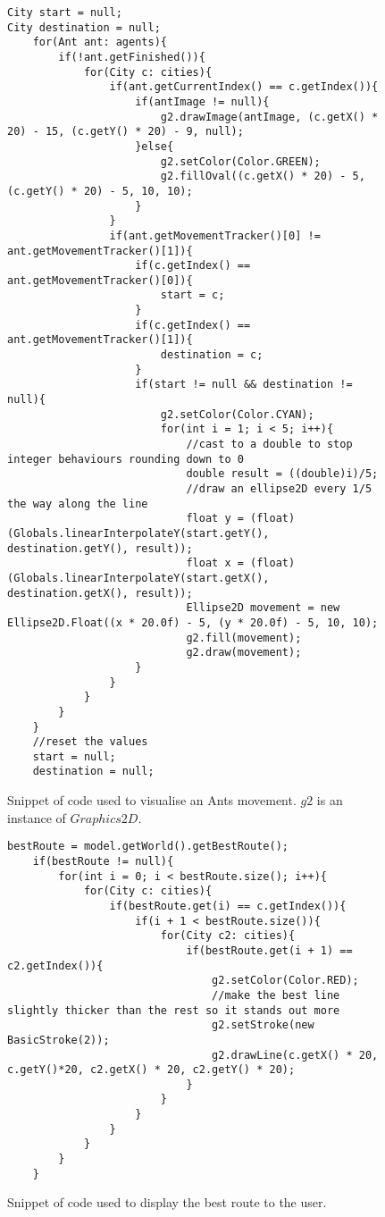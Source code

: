 \begin{figure}[H]
\begin{lstlisting}
City start = null;
City destination = null;
	for(Ant ant: agents){
		if(!ant.getFinished()){
			for(City c: cities){
				if(ant.getCurrentIndex() == c.getIndex()){
					if(antImage != null){
						g2.drawImage(antImage, (c.getX() * 20) - 15, (c.getY() * 20) - 9, null);
					}else{
						g2.setColor(Color.GREEN);
						g2.fillOval((c.getX() * 20) - 5, (c.getY() * 20) - 5, 10, 10);
					}
				}
				if(ant.getMovementTracker()[0] != ant.getMovementTracker()[1]){
					if(c.getIndex() == ant.getMovementTracker()[0]){
						start = c;
					}
					if(c.getIndex() == ant.getMovementTracker()[1]){
						destination = c;
					}
					if(start != null && destination != null){
						g2.setColor(Color.CYAN);
						for(int i = 1; i < 5; i++){
							//cast to a double to stop integer behaviours rounding down to 0
							double result = ((double)i)/5;
							//draw an ellipse2D every 1/5 the way along the line
							float y = (float) (Globals.linearInterpolateY(start.getY(), destination.getY(), result));
							float x = (float) (Globals.linearInterpolateY(start.getX(), destination.getX(), result));
							Ellipse2D movement = new Ellipse2D.Float((x * 20.0f) - 5, (y * 20.0f) - 5, 10, 10);
							g2.fill(movement);
							g2.draw(movement);
					}
				}
			}
		}
	}
	//reset the values
	start = null;
	destination = null;
\end{lstlisting}
\caption[Visualising Ant Movement Code]{Snippet of code used to visualise an Ants movement. $g2$ is an instance of $Graphics2D$.}
\label{antWalk}
\end{figure}

\begin{figure}[H]
\begin{lstlisting}
bestRoute = model.getWorld().getBestRoute();
	if(bestRoute != null){
		for(int i = 0; i < bestRoute.size(); i++){
			for(City c: cities){
				if(bestRoute.get(i) == c.getIndex()){
					if(i + 1 < bestRoute.size()){
						for(City c2: cities){
							if(bestRoute.get(i + 1) == c2.getIndex()){
								g2.setColor(Color.RED);
								//make the best line slightly thicker than the rest so it stands out more
								g2.setStroke(new BasicStroke(2));
								g2.drawLine(c.getX() * 20, c.getY()*20, c2.getX() * 20, c2.getY() * 20);
							}
						}
					}
				}
			}
		}
	}
\end{lstlisting}
\caption[Display Best Route Code]{Snippet of code used to display the best route to the user.}
\label{bestCode}
\end{figure}

